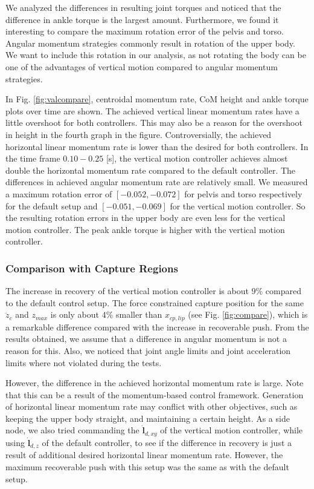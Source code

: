 \documentclass[letterpaper, 10 pt, conference]{ieeeconf}  %
\newcommand{\zmax}{z_{max}}
\begin{document}
We analyzed the differences in resulting joint torques and noticed that the difference in ankle torque is the largest amount. Furthermore, we found it interesting to compare the maximum rotation error of the pelvis and torso. Angular momentum strategies commonly result in rotation of the upper body. We want to include this rotation in our analysis, as not rotating the body can be one of the advantages of vertical motion compared to angular momentum strategies.

In Fig. \ref{fig:valcompare}, centroidal momentum rate, CoM height and ankle torque plots over time are shown. The achieved vertical linear momentum rates have a little overshoot for both controllers. This may also be a reason for the overshoot in height in the fourth graph in the figure. Controversially, the achieved horizontal linear momentum rate is lower than the desired for both controllers. In the time frame $0.10-0.25$ [s], the vertical motion controller achieves almost double the horizontal momentum rate compared to the default controller. The differences in achieved angular momentum rate are relatively small. We measured a maximum rotation error of $[-0.052,-0.072]$ for pelvis and torso respectively for the default setup and $[-0.051,-0.069]$ for the vertical motion controller. So the resulting rotation errors in the upper body are even less for the vertical motion controller. The peak ankle torque is higher with the vertical motion controller.


\subsubsection{Comparison with Capture Regions}
The increase in recovery of the vertical motion controller is about $9\%$ compared to the default control setup. The force constrained capture position for the same $\ddot{z}_c$ and $\zmax$ is only about $4\%$ smaller than $x_{cp,lip}$ (see Fig. \ref{fig:compare}), which is a remarkable difference compared with the increase in recoverable push. From the results obtained, we assume that a difference in angular momentum is not a reason for this. Also, we noticed that joint angle limits and joint acceleration limits where not violated during the tests. 

However, the difference in the achieved horizontal momentum rate is large. Note that this can be a result of the momentum-based control framework. Generation of horizontal linear momentum rate may conflict with other objectives, such as keeping the upper body straight, and maintaining a certain height. As a side node, we also tried commanding the $\dot{\mathbf{l}}_{d,xy}$ of the vertical motion controller, while using $\dot{\mathbf{l}}_{d,z}$ of the default controller, to see if the difference in recovery is just a result of additional desired horizontal linear momentum rate. However, the maximum recoverable push with this setup was the same as with the default setup.
\end{document}
